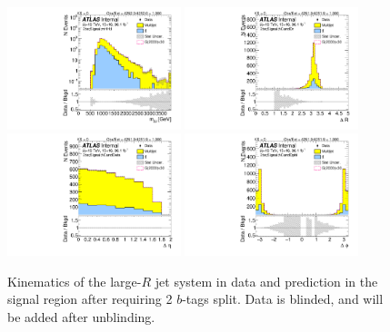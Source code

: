 \begin{figure}[htbp!]
\begin{center}
\includegraphics[width=0.45\textwidth,angle=-90]{figures/boosted/Signal/b77_TwoTag_split_Signal_mHH_l_1_blind.pdf}
\includegraphics[width=0.45\textwidth,angle=-90]{figures/boosted/Signal/b77_TwoTag_split_Signal_hCandDr_blind.pdf}\\
\includegraphics[width=0.45\textwidth,angle=-90]{figures/boosted/Signal/b77_TwoTag_split_Signal_hCandDeta_blind.pdf}
\includegraphics[width=0.45\textwidth,angle=-90]{figures/boosted/Signal/b77_TwoTag_split_Signal_hCandDphi_blind.pdf}
  \caption{Kinematics of the large-$R$ jet system in data and prediction in the signal region after requiring 2 $b$-tags split. Data is blinded, and will be added after unblinding. }
  \label{fig:boosted-2bs-signal-blind-ak10-system}
\end{center}
\end{figure}

\clearpage




